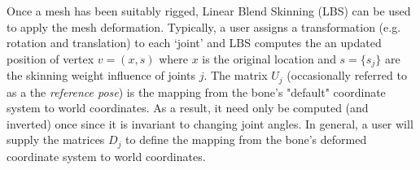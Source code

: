 \begin{definition}



Once a mesh has been suitably rigged, Linear Blend Skinning (LBS) can be used to apply the mesh deformation. Typically, a user assigns a transformation (e.g. rotation and translation) to each `joint' and LBS computes the an updated position of vertex $v = (x, s)$ where $x$ is the original location and $s = \{s_j\}$ are the skinning weight influence of joints $j$. The matrix $U_{j}$ (occasionally referred to as a the \emph{reference pose}) is the mapping from the bone's "default" coordinate system to world coordinates. As a result, it need only be computed (and inverted) once since it is invariant to changing joint angles. In general, a user will supply the matrices $D_{j}$ to define the mapping from the bone's deformed coordinate system to world coordinates.


\end{definition}
